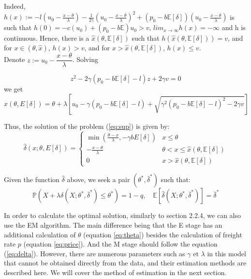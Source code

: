 \documentclass[a4paper,12pt]{article}
\begin{document}
Indeed, $h(x) := -l\left(u_0 - \frac{x - \theta}{\lambda}\right) - \frac{1}{2\gamma}\left(u_0 - \frac{x - \theta}{\lambda}\right)^2 + (p_0 - b\mathbb{E}[\delta])\left(u_0 - \frac{x - \theta}{\lambda}\right)$ is such that $h(0)=-c(u_0)+(p_0-b\mathbb{E})u_0>v, \, lim_{x\to\infty} h(x)= -\infty$ and h is continuous.
Hence, there is a $\hat{x}(\theta, \mathbb{E}[\delta])$ such that $h(\hat{x}(\theta, \mathbb{E}[\delta])) = v$, and for $x \in (\theta, \hat{x})$, $h(x) > v$, and for $x > \hat{x}(\theta, \mathbb{E}[\delta])$, $h(x) \leq v$.\\

Denote $z:=u_0-\dfrac{x-\theta}{\lambda}$. Solving

\begin{equation}
	z^2-2\gamma(p_0-b\mathbb{E}[\delta]-l)z+2\gamma v=0
\end{equation}
we get
\begin{equation}
	\hat{x}(\theta, E[\delta]) = \theta + \lambda \left[u_0 - \gamma(p_0 - b\mathbb{E}[\delta] - l)+ \sqrt{\gamma^2(p_0 - b\mathbb{E}[\delta] -l)^2 - 2\gamma v}\right]
\end{equation}

Thus, the solution of the problem (\ref{eq:sup}) is given by:
\begin{equation}
	\hat{\delta}(x; \theta, E[\delta]) =
	\begin{cases}
		\min \left(\frac{\theta - x}{\lambda}, -\gamma bE[\delta]\right) & x \leq \theta                                       \\
		-\frac{x - \theta}{\lambda}                                      & \theta < x \leq \hat{x}(\theta, \mathbb{E}[\delta]) \\
		0                                                                & x > \hat{x}(\theta, \mathbb{E}[\delta])
	\end{cases}
	\label{eq:delta}
\end{equation}

Given the function $\hat{\delta}$ above, we seek a pair $(\theta^*, \bar{\delta}^*)$ such that:
\begin{equation}
	\mathbb{P}(X+\lambda \delta (X;\theta^*,\bar{\delta}^*)\leq \theta^*) = 1-q, \quad \mathbb{E}[\hat{\delta}(X;\theta^*,\bar{\delta}^*)]=\bar{\delta}^*
\end{equation}


In order to calculate the optimal solution, similarly to section 2.2.4, we can also use the EM algorithm.
The main difference being that the E stage has an additional calculation of $\theta$ (equation \ref{eq:theta}) besides the calculation of freight rate $p$ (equation \ref{eq:price}). And the M stage should follow the equation (\ref{eq:delta}).
However, there are numerous parameters such as $\gamma$ et $\lambda$ in this model that cannot be obtained directly from the data, and their estimation methods are described here.
We will cover the method of estimation in the next section.
\end{document}
